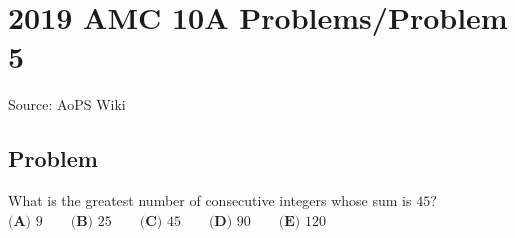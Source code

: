 \documentclass[12pt]{article}
\begin{document}
\section*{{2019 AMC 10A Problems/Problem 5}}
Source: AoPS Wiki

\subsection*{Problem}
What is the greatest number of consecutive integers whose sum is $45?$ $\textbf{(A) } 9 \qquad\textbf{(B) } 25 \qquad\textbf{(C) } 45 \qquad\textbf{(D) } 90 \qquad\textbf{(E) } 120$
\end{document}

